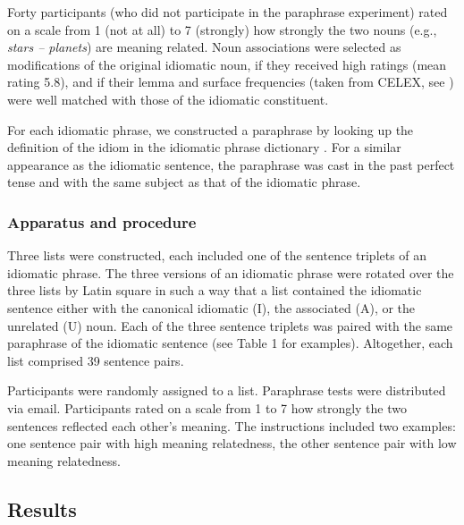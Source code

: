 \documentclass[output=paper]{langsci/langscibook}
\begin{document}
Forty participants (who did not participate in the paraphrase experiment) rated on a scale from 1 (not at all) to 7 (strongly) how strongly the two nouns (e.g., \textit{stars – planets}) are meaning related. Noun associations were selected as modifications of the original idiomatic noun, if they received high ratings (mean rating 5.8), and if their lemma and surface frequencies (taken from CELEX, see \citealt{baayen:1993}) were well matched with those of the idiomatic constituent. 

For each idiomatic phrase, we constructed a paraphrase by looking up the definition of the idiom in the idiomatic phrase dictionary \citep{redewendungen:2002}. For a similar appearance as the idiomatic sentence, the paraphrase was cast in the past perfect tense and with the same subject as that of the idiomatic phrase. 

\subsubsection{Apparatus and procedure}
Three lists were constructed, each included one of the sentence triplets of an idiomatic phrase.  The three versions of an idiomatic phrase were rotated over the three lists by Latin square in such a way that a list contained the idiomatic sentence either with the canonical idiomatic (I), the associated (A), or the unrelated (U) noun. Each of the three sentence triplets was paired with the same paraphrase of the idiomatic sentence (see Table 1 for examples). Altogether, each list comprised 39 sentence pairs. 

Participants were randomly assigned to a list. Paraphrase tests were distributed via email. Participants rated on a scale from 1 to 7 how strongly the two sentences reflected each other’s meaning. The instructions included two examples: one sentence pair with high meaning relatedness, the other sentence pair with low meaning relatedness. 

\subsection{Results}
\end{document}
